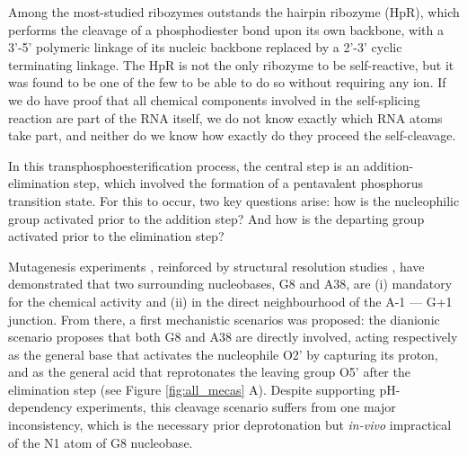 \documentclass[journal=jacsat,manuscript=article]{achemso}
\begin{document}
Among the most-studied ribozymes outstands the hairpin ribozyme (HpR), which performs the cleavage of a phosphodiester bond upon its own backbone,
with a 3'-5' polymeric linkage of its nucleic backbone replaced by a 2'-3' cyclic terminating linkage.  
The HpR is not the only ribozyme to be self-reactive, but it was found to be one of the few to be able to do so without requiring any ion. 
If we do have proof that all chemical components involved in the self-splicing reaction are part of the RNA itself, we do not 
know exactly which RNA atoms take part, and neither do we know how exactly do they proceed the self-cleavage. 


In this transphosphoesterification process, 
the central step is an addition-elimination step, which involved the formation of a pentavalent phosphorus transition state.
For this to occur, two key questions arise: how is the nucleophilic group activated prior to the addition step?
And how is the departing group activated prior to the elimination step?

Mutagenesis experiments \cite{kuzmin_role_2005}, reinforced by structural resolution studies \cite{rupert_crystal_2001,salter_water_2006},
have demonstrated that two surrounding nucleobases, G8 and A38, are (i) mandatory for the chemical activity and (ii) in the direct neighbourhood of the A-1 --- G+1 junction.
From there, a first mechanistic scenarios was proposed: the dianionic scenario proposes that both G8 and A38 are directly involved, 
acting respectively as the general base that activates the nucleophile O2' by capturing its proton, 
and as the general acid that reprotonates the leaving group O5' after the elimination step (see Figure \ref{fig:all_mecas} A).
Despite supporting pH-dependency experiments, this cleavage scenario suffers from one major inconsistency, 
which is the necessary prior deprotonation but \textit{in-vivo} impractical of the N1 atom of G8 nucleobase.
\end{document}
